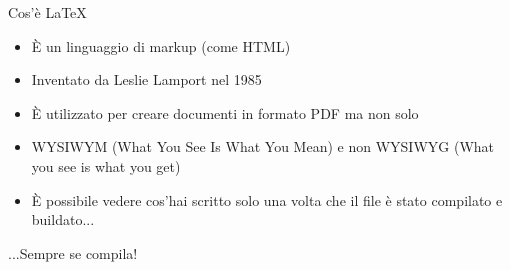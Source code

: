 \begin{frame}{Cos'è \LaTeX}
	\begin{itemize}
		\item È un linguaggio di markup (come HTML)
		\item Inventato da Leslie Lamport nel 1985
		\item È utilizzato per creare documenti in formato PDF ma non solo
		\item WYSIWYM (What You See Is What You Mean) e non WYSIWYG (What you see is what you get)
		\item È possibile vedere cos'hai scritto solo una volta che il file è stato compilato e buildato...
	\end{itemize}

	\vfill
	...Sempre se compila!
\end{frame}